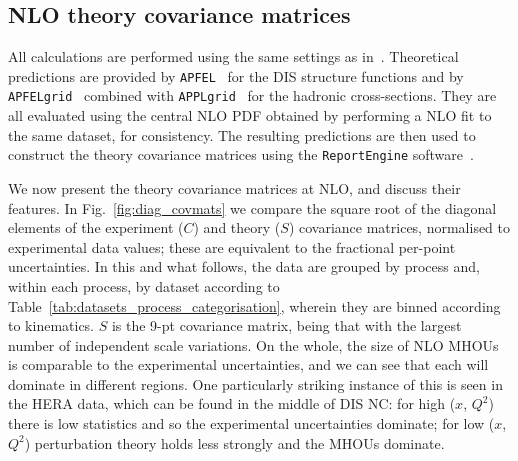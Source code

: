\subsection{NLO theory covariance matrices}
All calculations are performed using 
the same settings as in~\cite{Ball:2017nwa}. Theoretical predictions are provided by {\tt APFEL}~\cite{Bertone:2013vaa} for the DIS structure functions
and by {\tt APFELgrid}~\cite{Bertone:2016lga} combined with
{\tt APPLgrid}~\cite{Carli:2010rw} for the hadronic
cross-sections. They are all evaluated using the central NLO PDF obtained by performing a NLO fit to the same dataset, for consistency. The resulting predictions are then used to construct the theory covariance matrices using the {\tt ReportEngine} software~\cite{zahari_kassabov_2019_2571601}.

We now present the theory covariance matrices at NLO, and discuss their features. In Fig.~\ref{fig:diag_covmats} we compare the square root of the diagonal elements of the experiment ($C$) and theory ($S$) covariance matrices, normalised to experimental data values; these are equivalent to the fractional per-point uncertainties. In this and what follows, the data are grouped by process and, within each process, by dataset according to Table~\ref{tab:datasets_process_categorisation}, wherein they are binned according to kinematics. $S$ is the 9-pt covariance matrix, being that with the largest number of independent scale variations. On the whole, the size of NLO MHOUs is comparable to the experimental uncertainties, and we can see that each will dominate in different regions. One particularly striking instance of this is seen in the HERA data, which can be found in the middle of DIS NC: for high ($x$, $Q^2$) there is low statistics and so the experimental uncertainties dominate; for low ($x$, $Q^2$) perturbation theory holds less strongly and the MHOUs dominate. 
